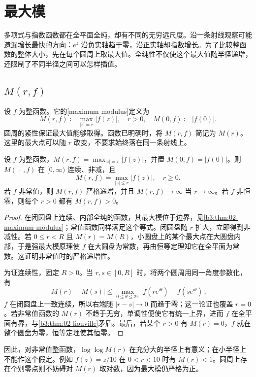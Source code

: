\section{最大模}
\label{b3:sec:1901}

多项式与指数函数都在全平面全纯，却有不同的无穷远尺度。沿一条射线观察可能遗漏增长最快的方向：\(e^z\) 沿负实轴趋于零，沿正实轴却指数增长。为了比较整函数的整体大小，先在每个圆周上取最大值。全纯性不仅使这个最大值随半径递增，还限制了不同半径之间可以怎样插值。

\subsection{\texorpdfstring{\(M(r,f)\)}{M(r,f)}}
\label{b3:subsec:190101}

设 \(f\) 为整函数。它的[maximum modulus]定义为
\[
 M(r,f)\coloneqq\max_{|z|=r}|f(z)|,\quad r>0,
 \quad M(0,f)\coloneqq|f(0)|.
\]
圆周的紧性保证最大值能够取得。函数已明确时，将 \(M(r,f)\) 简记为 \(M(r)\)。这里的最大点可以随 \(r\) 改变，不要求始终落在同一条射线上。

\begin{proposition}[最大模的基本性质]\label{b3:prop:19-maximum-modulus}
设 \(f\) 为整函数，\(M(r,f)=\max_{|z|=r}|f(z)|\)，并置 \(M(0,f)=|f(0)|\)。则 \(M(\,\cdot\,,f)\) 在 \([0,\infty)\) 连续、非减，且
\[
 M(r,f)=\max_{|z|\le r}|f(z)|,\quad r\ge0.
\]
若 \(f\) 非常值，则 \(M(r,f)\) 严格递增，并且 \(M(r,f)\to\infty\) 当 \(r\to\infty\)。若 \(f\) 非恒零，则每个 \(r>0\) 都有 \(M(r,f)>0\)。
\end{proposition}
\begin{proof}
在闭圆盘上连续、内部全纯的函数，其最大模位于边界，见\cref{b3:thm:02-maximum-modulus}；常值函数同样满足这个等式。闭圆盘随 \(r\) 扩大，立即得到非减性。若 \(0\le r<R\) 且 \(M(r)=M(R)\)，小圆盘上的某个最大点在大圆盘内部，于是强最大模原理使 \(f\) 在大圆盘为常数，再由恒等定理知它在全平面为常数。这证明非常值时的严格递增性。

为证连续性，固定 \(R>0\)。当 \(r,s\in[0,R]\) 时，将两个圆周用同一角度参数化，有
\[
 |M(r)-M(s)|
 \le\max_{0\le\theta\le2\pi}
 \bigl|f(re^{\mathrm{i}\theta})-f(se^{\mathrm{i}\theta})\bigr|.
\]
\(f\) 在闭圆盘上一致连续，所以右端随 \(|r-s|\to0\) 而趋于零；这一论证也覆盖 \(r=0\)。若非常值函数的 \(M(r)\) 不趋于无穷，单调性便使它有统一上界，进而 \(f\) 在全平面有界，与\cref{b3:thm:02-liouville}矛盾。最后，若某个 \(r>0\) 有 \(M(r)=0\)，\(f\) 就在整个圆盘为零，恒等定理使其恒零。
\end{proof}
因此，对非常值整函数，\(\log\log M(r)\) 在充分大的半径上有意义；在小半径上不能作这个假定。例如 \(f(z)=z/10\) 在 \(0<r<10\) 时有 \(M(r)<1\)。圆周上存在个别零点则不妨碍对 \(M(r)\) 取对数，因为最大模仍严格为正。

